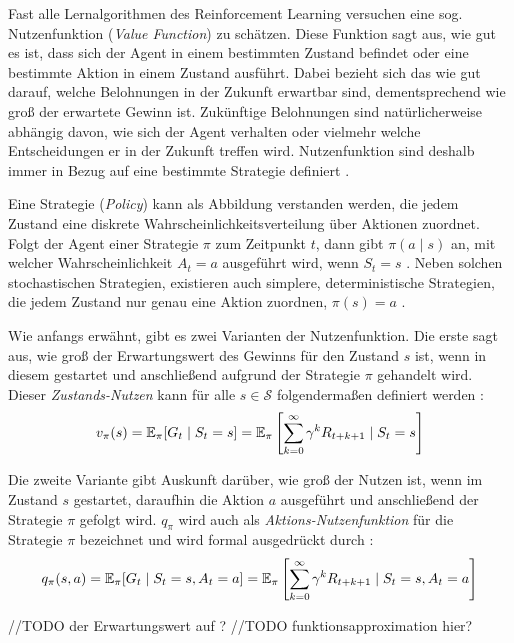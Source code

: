 Fast alle Lernalgorithmen des Reinforcement Learning versuchen eine sog. Nutzenfunktion (\textit{Value Function}) zu schätzen. Diese Funktion sagt aus, \glqq wie gut\grqq{} es ist, dass sich der Agent in einem bestimmten Zustand befindet oder eine bestimmte Aktion in einem Zustand ausführt. Dabei bezieht sich das \glqq wie gut\grqq{} darauf,
welche Belohnungen in der Zukunft erwartbar sind, dementsprechend wie groß der erwartete Gewinn ist. Zukünftige Belohnungen sind natürlicherweise abhängig davon, wie sich der Agent verhalten oder vielmehr welche Entscheidungen er in der Zukunft treffen wird. Nutzenfunktion sind deshalb immer in Bezug auf eine bestimmte Strategie definiert \cite[S.~58]{Sutton1998}.
\par 
Eine Strategie (\textit{Policy}) kann als Abbildung verstanden werden, die jedem Zustand eine diskrete Wahrscheinlichkeitsverteilung über Aktionen zuordnet. Folgt der Agent einer Strategie $\pi$ zum Zeitpunkt $t$, dann gibt $\pi(a\mid s)$ an, mit welcher Wahrscheinlichkeit $A_t = a$ ausgeführt wird, wenn $S_t = s$ \cite[S.~58]{Sutton1998}. Neben solchen stochastischen Strategien, existieren auch simplere, deterministische Strategien, die jedem Zustand nur genau eine Aktion zuordnen, $\pi (s) = a$ \cite[]{Brunskill}.
\par
Wie anfangs erwähnt, gibt es zwei Varianten der Nutzenfunktion. Die erste sagt aus, wie groß der Erwartungswert des Gewinns für den Zustand $s$ ist, wenn in diesem gestartet und anschließend aufgrund der Strategie $\pi$ gehandelt wird. Dieser \textit{Zustands-Nutzen} kann für alle $s \in \mathcal{S}$ folgendermaßen definiert werden \cite[S.~58]{Sutton1998}:
\begin{equation}\label{eq:valueFunction}
    v_\pi(s) = \operatorname{\mathbb{E}}_\pi[G_t \mid S_t = s] = \operatorname{\mathbb{E}}_\pi \left[\sum_{k=0}^\infty{\gamma^k R_{t+k+1} \mid S_t = s} \right]
\end{equation}

Die zweite Variante gibt Auskunft darüber, wie groß der Nutzen ist, wenn im Zustand $s$ gestartet, daraufhin die Aktion $a$ ausgeführt und anschließend der Strategie $\pi$ gefolgt wird. $q_\pi$ wird auch als \textit{Aktions-Nutzenfunktion} für die Strategie $\pi$ bezeichnet und wird formal ausgedrückt durch \cite[S.~58]{Sutton1998}:
\begin{equation}\label{eq:actionValueFunction}
    q_\pi(s,a) = \operatorname{\mathbb{E}}_\pi[G_t \mid S_t = s, A_t = a] = \operatorname{\mathbb{E}}_\pi\left[\sum_{k=0}^\infty{\gamma^k R_{t+k+1} \mid S_t = s, A_t = a}\right]
\end{equation}

//TODO der Erwartungswert auf ?
//TODO funktionsapproximation hier? 